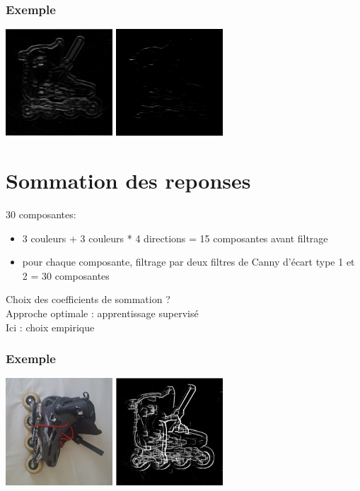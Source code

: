 \documentclass[french]{beamer}
\begin{document}
\begin{frame}
	\frametitle{Exemple}
	\includegraphics[width=4cm]{images/roller_filtered.jpg} \; \includegraphics[width=4cm]{images/roller_localised.jpg}
\end{frame}

\section{Sommation des reponses}

\begin{frame}
	30 composantes:
	\begin{itemize}
		\item 3 couleurs + 3 couleurs * 4 directions = 15 composantes avant filtrage
		\item pour chaque composante, filtrage par deux filtres de Canny d'écart type 1 et 2 = 30 composantes
	\end{itemize}
	Choix des coefficients de sommation ?\\
	Approche optimale : apprentissage supervisé\\
	Ici : choix empirique
\end{frame}

\begin{frame}
	\frametitle{Exemple}
	\includegraphics[width=4cm]{images/roller.png} \; \includegraphics[width = 4cm]{images/roller_res.jpg}
\end{frame}
\end{document}
